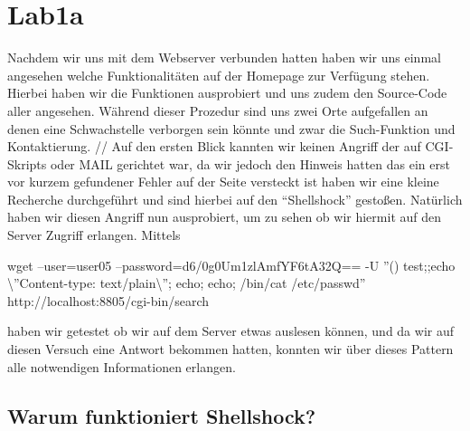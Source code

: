 \documentclass[12pt,a4paper,titlepage,oneside]{scrartcl}
\begin{document}
\maketitle
\setcounter{section}{0}
\setcounter{tocdepth}{2}
\tableofcontents

%
%

\section{Lab1a}

Nachdem wir uns mit dem Webserver verbunden hatten haben wir uns einmal angesehen welche Funktionalitäten auf der Homepage zur Verfügung stehen. Hierbei haben wir die Funktionen ausprobiert und uns zudem den Source-Code aller angesehen. Während dieser Prozedur sind uns zwei Orte aufgefallen an denen eine Schwachstelle verborgen sein könnte und zwar die Such-Funktion und Kontaktierung. //
Auf den ersten Blick kannten wir keinen Angriff der auf CGI-Skripts oder MAIL gerichtet war, da wir jedoch den Hinweis hatten das ein erst vor kurzem gefundener Fehler auf der Seite versteckt ist haben wir eine kleine Recherche durchgeführt und sind hierbei auf den "`Shellshock"' gestoßen. Natürlich haben wir diesen Angriff nun ausprobiert, um zu sehen ob wir hiermit auf den Server Zugriff erlangen. Mittels 
\begin{center}
wget --user=user05 --password=d6/0g0Um1zlAmfYF6tA32Q== -U ''() { test;};echo \textbackslash''Content-type: text/plain\textbackslash''; echo; echo; /bin/cat /etc/passwd'' http://localhost:8805/cgi-bin/search
\end{center}
haben wir getestet ob wir auf dem Server etwas auslesen können, und da wir auf diesen Versuch eine Antwort bekommen hatten, konnten wir über dieses Pattern alle notwendigen Informationen erlangen. 

\subsection{Warum funktioniert Shellshock?}
\end{document}
